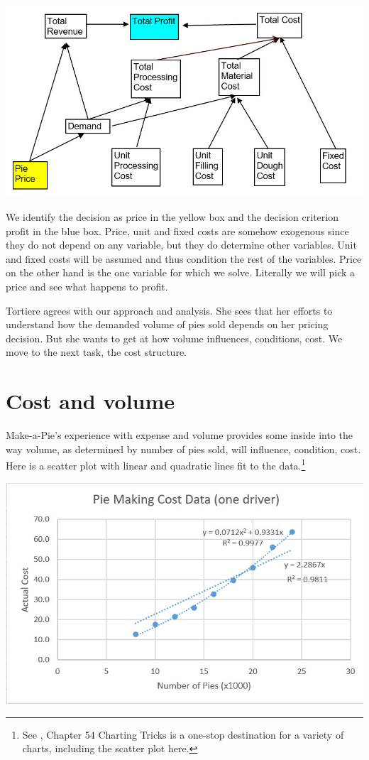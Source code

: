 \documentclass[
]{book}
\begin{document}
\includegraphics{images/01/pie-influence-diagram.jpg}

We identify the decision as price in the yellow box and the decision criterion profit in the blue box. Price, unit and fixed costs are somehow exogenous since they do not depend on any variable, but they do determine other variables. Unit and fixed costs will be assumed and thus condition the rest of the variables. Price on the other hand is the one variable for which we solve. Literally we will pick a price and see what happens to profit.

Tortiere agrees with our approach and analysis. She sees that her efforts to understand how the demanded volume of pies sold depends on her pricing decision. But she wants to get at how volume influences, conditions, cost. We move to the next task, the cost structure.

\hypertarget{cost-and-volume}{%
\section{Cost and volume}\label{cost-and-volume}}

Make-a-Pie's experience with expense and volume provides some inside into the way volume, as determined by number of pies sold, will influence, condition, cost. Here is a scatter plot with linear and quadratic lines fit to the data.\footnote{See \citet{Winston2019}, Chapter 54 Charting Tricks is a one-stop destination for a variety of charts, including the scatter plot here.}

\includegraphics{images/01/pie-xost-graph.jpg}
\end{document}
